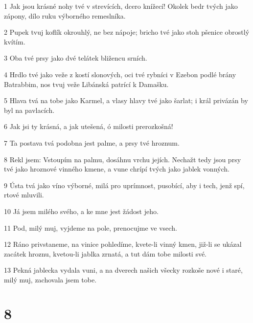\par 1 Jak jsou krásné nohy tvé v strevících, dcero knížecí! Okolek bedr tvých jako zápony, dílo ruku výborného remeslníka.
\par 2 Pupek tvuj koflík okrouhlý, ne bez nápoje; bricho tvé jako stoh pšenice obrostlý kvítím.
\par 3 Oba tvé prsy jako dvé telátek bližencu srních.
\par 4 Hrdlo tvé jako veže z kostí slonových, oci tvé rybníci v Ezebon podlé brány Batrabbim, nos tvuj veže Libánská patrící k Damašku.
\par 5 Hlava tvá na tobe jako Karmel, a vlasy hlavy tvé jako šarlat; i král privázán by byl na pavlacích.
\par 6 Jak jsi ty krásná, a jak utešená, ó milosti prerozkošná!
\par 7 Ta postava tvá podobna jest palme, a prsy tvé hroznum.
\par 8 Rekl jsem: Vstoupím na palmu, dosáhnu vrchu jejích. Nechažt tedy jsou prsy tvé jako hroznové vinného kmene, a vune chrípí tvých jako jablek vonných.
\par 9 Ústa tvá jako víno výborné, milá pro uprímnost, pusobící, aby i tech, jenž spí, rtové mluvili.
\par 10 Já jsem milého svého, a ke mne jest žádost jeho.
\par 11 Pod, milý muj, vyjdeme na pole, prenocujme ve vsech.
\par 12 Ráno privstaneme, na vinice pohledíme, kvete-li vinný kmen, již-li se ukázal zacátek hroznu, kvetou-li jablka zrnatá, a tut dám tobe milosti své.
\par 13 Pekná jablecka vydala vuni, a na dverech našich všecky rozkoše nové i staré, milý muj, zachovala jsem tobe.

\chapter{8}


